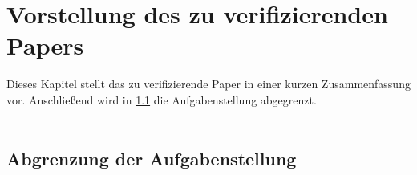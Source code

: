 \chapter{Vorstellung des zu verifizierenden Papers}
\label{chap:vorstellung}
Dieses Kapitel stellt das zu verifizierende Paper in einer kurzen Zusammenfassung vor. Anschließend wird in \ref{sec:abgrenzung} die Aufgabenstellung abgegrenzt. 
\\ \\


\section{Abgrenzung der Aufgabenstellung}
\label{sec:abgrenzung}

